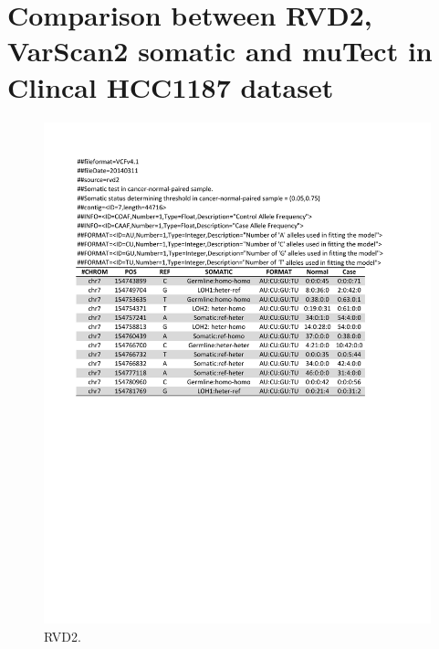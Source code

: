 \documentclass[11pt,reqno]{amsart}
\begin{document}
\section{Comparison between RVD2, VarScan2 somatic and muTect in Clincal HCC1187 dataset}
\begin{figure}[H]
\begin{center}
\includegraphics[width=1\textwidth]{pdf_figs/HCC1187_RVD2.pdf}
\caption{RVD2.}
\label{fig:rd_RVD2}
\end{center}
\end{figure}
\end{document}
